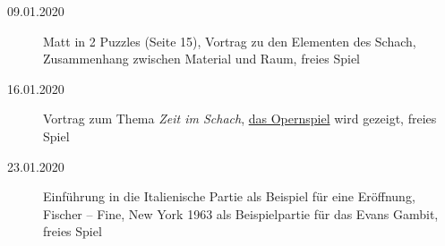 \documentclass[
  a4paper,
  justified,
  nobib,
]{tufte-handout}
\begin{document}
\begin{description}
  \item[09.01.2020] Matt in 2 Puzzles (Seite 15),
    Vortrag zu den Elementen des Schach,
    Zusammenhang zwischen Material und Raum,
    freies Spiel

  \item[16.01.2020] Vortrag zum Thema \emph{Zeit im Schach},
    \hyperref[par:the_opera_game]{das Opernspiel} wird gezeigt,
    freies Spiel

  \item[23.01.2020] Einführung in die Italienische Partie als Beispiel für eine Eröffnung,
    Fischer – Fine, New York 1963 als Beispielpartie für das Evans Gambit,
    freies Spiel

\end{description}
\end{document}

